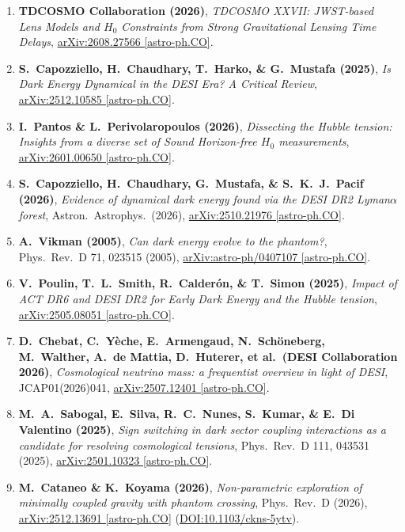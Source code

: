 \documentclass[aps,prd,preprint,superscriptaddress,nofootinbib]{revtex4-2}
\begin{document}
\begin{enumerate}
    \item \textbf{TDCOSMO Collaboration (2026)}, \emph{TDCOSMO XXVII: JWST-based Lens Models and $H_0$ Constraints from Strong Gravitational Lensing Time Delays}, \href{https://arxiv.org/abs/2608.27566}{arXiv:2608.27566 [astro-ph.CO]}.
    \item \textbf{S.\ Capozziello, H.\ Chaudhary, T.\ Harko, \& G.\ Mustafa (2025)}, \emph{Is Dark Energy Dynamical in the DESI Era? A Critical Review}, \href{https://arxiv.org/abs/2512.10585}{arXiv:2512.10585 [astro-ph.CO]}.
    \item \textbf{I.\ Pantos \& L.\ Perivolaropoulos (2026)}, \emph{Dissecting the Hubble tension: Insights from a diverse set of Sound Horizon-free $H_0$ measurements}, \href{https://arxiv.org/abs/2601.00650}{arXiv:2601.00650 [astro-ph.CO]}.
    \item \textbf{S.\ Capozziello, H.\ Chaudhary, G.\ Mustafa, \& S.\ K.\ J.\ Pacif (2026)}, \emph{Evidence of dynamical dark energy found via the DESI DR2 Lyman$\alpha$ forest}, Astron.\ Astrophys.\ (2026), \href{https://arxiv.org/abs/2510.21976}{arXiv:2510.21976 [astro-ph.CO]}.
    \item \textbf{A.\ Vikman (2005)}, \emph{Can dark energy evolve to the phantom?}, Phys.\ Rev.\ D 71, 023515 (2005), \href{https://arxiv.org/abs/astro-ph/0407107}{arXiv:astro-ph/0407107 [astro-ph.CO]}.
    \item \textbf{V.\ Poulin, T.\ L.\ Smith, R.\ Calder\'on, \& T.\ Simon (2025)}, \emph{Impact of ACT DR6 and DESI DR2 for Early Dark Energy and the Hubble tension}, \href{https://arxiv.org/abs/2505.08051}{arXiv:2505.08051 [astro-ph.CO]}.
    \item \textbf{D.\ Chebat, C.\ Y\`eche, E.\ Armengaud, N.\ Sch\"oneberg, M.\ Walther, A.\ de Mattia, D.\ Huterer, et al.\ (DESI Collaboration 2026)}, \emph{Cosmological neutrino mass: a frequentist overview in light of DESI}, JCAP01(2026)041, \href{https://arxiv.org/abs/2507.12401}{arXiv:2507.12401 [astro-ph.CO]}.
    \item \textbf{M.\ A.\ Sabogal, E.\ Silva, R.\ C.\ Nunes, S.\ Kumar, \& E.\ Di Valentino (2025)}, \emph{Sign switching in dark sector coupling interactions as a candidate for resolving cosmological tensions}, Phys.\ Rev.\ D 111, 043531 (2025), \href{https://arxiv.org/abs/2501.10323}{arXiv:2501.10323 [astro-ph.CO]}.
    \item \textbf{M.\ Cataneo \& K.\ Koyama (2026)}, \emph{Non-parametric exploration of minimally coupled gravity with phantom crossing}, Phys.\ Rev.\ D (2026), \href{https://arxiv.org/abs/2512.13691}{arXiv:2512.13691 [astro-ph.CO]} (\href{https://journals.aps.org/prd/abstract/10.1103/ckns-5ytv}{DOI:10.1103/ckns-5ytv}).

\end{enumerate}
\end{document}
